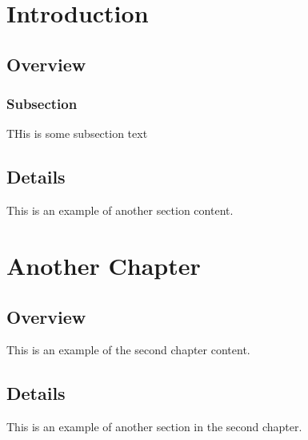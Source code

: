 \documentclass[openany, 11pt]{book}
\begin{document}
\chapter{Introduction}
\section{Overview}
\subsection{Subsection}

THis is some subsection text

\section{Details}
This is an example of another section content.

\chapter{Another Chapter}
\section{Overview}
This is an example of the second chapter content.

\section{Details}
This is an example of another section in the second chapter.
\end{document}
